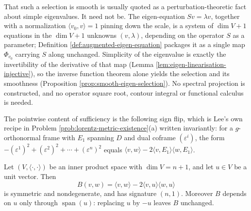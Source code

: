 That such a selection is smooth is usually quoted as a perturbation-theoretic fact about simple eigenvalues. It need not be. The eigen-equation $Sv = \lambda v$, together with a normalization $\langle v_0, v\rangle = 1$ pinning down the scale, is a system of $\dim V + 1$ equations in the $\dim V + 1$ unknowns $(v,\lambda)$, depending on the operator $S$ as a parameter; Definition \ref{def:augmented-eigen-equation} packages it as a single map $\Phi_{v_0}$ carrying $S$ along unchanged. Simplicity of the eigenvalue is exactly the invertibility of the derivative of that map (Lemma \ref{lem:eigen-linearisation-injective}), so the inverse function theorem alone yields the selection and its smoothness (Proposition \ref{prop:smooth-eigen-selection}). No spectral projection is constructed, and no operator square root, contour integral or functional calculus is needed.

The pointwise content of sufficiency is the following sign flip, which is Lee's own recipe in Problem \ref{prob:lorentz-metric-existence}(a) written invariantly: for a $g$-orthonormal frame with $E_1$ spanning $D$ and dual coframe $(\varepsilon^i)$, the form $-(\varepsilon^1)^2 + (\varepsilon^2)^2 + \cdots + (\varepsilon^n)^2$ equals $\langle v,w\rangle - 2\langle v,E_1\rangle\langle w,E_1\rangle$.

\begin{lemma}
\label{lem:lorentz-form-pointwise}
\leanok
{}
Let $(V, \langle\cdot,\cdot\rangle)$ be an inner product space with $\dim V = n+1$, and let $u \in V$ be a unit vector. Then
\[
  B(v,w) = \langle v,w\rangle - 2\langle v,u\rangle\langle w,u\rangle
\]
is symmetric and nondegenerate, and has signature $(n,1)$. Moreover $B$ depends on $u$ only through $\operatorname{span}(u)$: replacing $u$ by $-u$ leaves $B$ unchanged.
\end{lemma}

